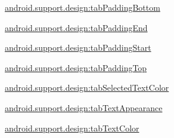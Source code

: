 {\ttfamily \hyperlink{classandroid_1_1support_1_1design_1_1R_1_1styleable_a88bec9e2eb895346151cb36bc599871c}{android.\+support.\+design\+:tab\+Padding\+Bottom}}

{\ttfamily \hyperlink{classandroid_1_1support_1_1design_1_1R_1_1styleable_ab963ac8c82c085a0a654975e88afb71b}{android.\+support.\+design\+:tab\+Padding\+End}}

{\ttfamily \hyperlink{classandroid_1_1support_1_1design_1_1R_1_1styleable_af09be2b7a72af9b14738fc83b314b129}{android.\+support.\+design\+:tab\+Padding\+Start}}

{\ttfamily \hyperlink{classandroid_1_1support_1_1design_1_1R_1_1styleable_a266ce11736ecf5a362936eddab89acd3}{android.\+support.\+design\+:tab\+Padding\+Top}}

{\ttfamily \hyperlink{classandroid_1_1support_1_1design_1_1R_1_1styleable_a7cb7d0e87c86773cc262cd3f36706eef}{android.\+support.\+design\+:tab\+Selected\+Text\+Color}}

{\ttfamily \hyperlink{classandroid_1_1support_1_1design_1_1R_1_1styleable_a79348bc9ddfecdbdc92dcc36d85832b2}{android.\+support.\+design\+:tab\+Text\+Appearance}}

{\ttfamily \hyperlink{classandroid_1_1support_1_1design_1_1R_1_1styleable_afae09ccec67f90fecb5707a8dd509451}{android.\+support.\+design\+:tab\+Text\+Color}}

